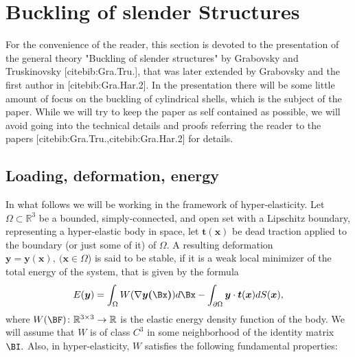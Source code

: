 
\section{Buckling of slender Structures}
\setcounter{equation}{0}
\label{sec:2}

For the convenience of the reader, this section is devoted to the presentation of the general theory "Buckling of slender structures" by Grabovsky and Truskinovsky [cite{bib:Gra.Tru.}], that was later extended by Grabovsky and the first author in [cite{bib:Gra.Har.2}]. In the presentation there will be some little amount of focus on the buckling of cylindrical shells, which is the subject of the paper. While we will try to keep the paper as self contained as possible, we will avoid going into the technical details and proofs referring the reader to the papers [cite{bib:Gra.Tru.},cite{bib:Gra.Har.2}] for details. 

\subsection{Loading, deformation, energy}
\label{sec:2.1}

In what follows we will be working in the framework of hyper-elasticity. Let $\Omega\subset\mathbb{R}^3$ be a bounded, simply-connected, and open set with a Lipschitz boundary, representing a hyper-elastic body in space, let $\bm t(\bm x)$ be dead traction applied to the boundary (or just some of it) of $\Omega.$ A resulting deformation $\bm y=\bm y (\bm x),\ (\bm x\in \Omega$) is said to be stable, if it is a weak local minimizer of the total energy of the system, that is given by the formula
\begin{equation}
\label{2.1}
E(\boldsymbol{y})=\int_{\Omega} W(\nabla \boldsymbol{y(\Bx)}) d \Bx -\int_{\partial \Omega} \boldsymbol{y} \cdot \boldsymbol{t}(\boldsymbol{x}) d S(\boldsymbol{x}),
\end{equation}
where $W(\BF)\colon\mathbb R^{3\times 3}\to\mathbb R$ is the elastic energy density function of the body. We will assume that $W$ is of class $C^3$ in some neighborhood of the identity matrix $\BI.$ Also, in hyper-elasticity, $W$ satisfies the following fundamental properties:

